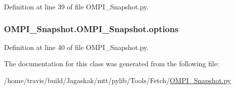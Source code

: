 Definition at line 39 of file O\-M\-P\-I\-\_\-\-Snapshot.\-py.

\hypertarget{classOMPI__Snapshot_1_1OMPI__Snapshot_a1977ca5a7120bd199d1de101a0fb8c34}{
\subsubsection[{options}]{\setlength{\rightskip}{0pt plus 5cm}O\-M\-P\-I\-\_\-\-Snapshot.\-O\-M\-P\-I\-\_\-\-Snapshot.\-options}}\label{classOMPI__Snapshot_1_1OMPI__Snapshot_a1977ca5a7120bd199d1de101a0fb8c34}


Definition at line 40 of file O\-M\-P\-I\-\_\-\-Snapshot.\-py.



The documentation for this class was generated from the following file\-:\begin{DoxyCompactItemize}
\item 
/home/travis/build/\-Jagaskak/mtt/pylib/\-Tools/\-Fetch/\hyperlink{OMPI__Snapshot_8py}{O\-M\-P\-I\-\_\-\-Snapshot.\-py}\end{DoxyCompactItemize}
